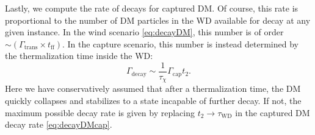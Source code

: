 Lastly, we compute the rate of decays for captured DM.  
Of course, this rate is proportional to the number of DM particles in the WD available for decay at any given instance.  
In the wind scenario \eqref{eq:decayDM}, this number is of order $\sim (\Gamma_\text{trans} \times t_\text{ff})$.  
In the capture scenario, this number is instead determined by the thermalization time inside the WD:
\begin{equation}
\Gamma_\text{decay} \sim  \frac{1}{\tau_\chi} \Gamma_\text{cap} t_2.
\label{eq:decayDMcap}
\end{equation}
Here we have conservatively assumed that after a thermalization time, the DM quickly collapses and stabilizes to a state incapable of further decay.
If not, the maximum possible decay rate is given by replacing $t_2 \to \tau_\text{WD}$ in the captured DM decay rate \eqref{eq:decayDMcap}.